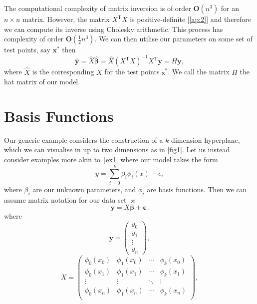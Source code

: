 \documentclass[10pt,a4paper, onecolumn, conference]{IEEEtran}
\theoremstyle{own}
\theoremstyle{definition}
\theoremstyle{plain}
\begin{document}
The computational complexity of matrix inversion is of order $\mathbf{O}(n^3)$ for an $n\times n$ matrix. However, the matrix $X^{\text{T}}X$ is positive-definite [\ref{ap:2}] and therefore we can compute its inverse using Cholesky arithmetic. This process has complexity of order $\mathbf{O}(\frac{1}{2} n^3)$. We can then utilise our parameters on some set of test points, say $\mathbf{x}^{*}$ then
\begin{equation}
\hat{\mathbf{y}} = \hat{X} \hat{\boldsymbol\beta} = \hat{X} (X^{\text{T}} X)^{-1} X^{\text{T}}\mathbf{y} = H\textbf{y},
\end{equation}
where $\hat{X}$ is the corresponding $X$ for the test points $\mathsf{x}^{*}$. We call the matrix $H$ the hat matrix of our model.
\section{Basis Functions}
Our generic example considers the construction of a $k$ dimension hyperplane, which we can visualise in up to two dimensions as in \cref{fig1}. Let us instead consider examples more akin to~\cref{ex1} where our model takes the form
\begin{equation}
y = \sum_{i = 0}^{k} \beta_i \phi_i(x) + \epsilon,
\end{equation}
where $\beta_i$ are our unknown parameters, and $\phi_i$ are basis functions. Then we can assume matrix notation for our data set $\varkappa$
\begin{equation}
\mathbf{y} = X \boldsymbol\beta + \boldsymbol\varepsilon.
\end{equation}
where
\begin{equation}
\mathbf{y} = \left( \begin{matrix} y_0 \\ y_1 \\ \vdots \\ y_n \end{matrix} \right),
\end{equation}
\begin{equation}
X = \left( \begin{matrix}
\phi_0(x_0) & \phi_1(x_0) & \cdots & \phi_k(x_0) \\
\phi_0(x_1) & \phi_1(x_1) & \cdots & \phi_k(x_1) \\
\vdots & \vdots & \ddots & \vdots \\
\phi_0(x_n) & \phi_1(x_n) & \cdots & \phi_k(x_n) \\
\end{matrix} \right),
\end{equation}
\end{document}
